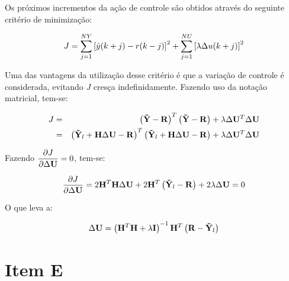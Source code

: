 Os próximos incrementos da ação de controle são obtidos através do seguinte
critério de minimização:

\begin{equation*}
J = \sum_{j=1}^{NY}\left[\hat{y}(k+j)-r(k-j)\right]^2 + 
    \sum_{j=1}^{NU}\left[\lambda\Delta u(k+j)\right]^2
\end{equation*}

Uma das vantagens da utilização desse critério é que a variação de controle é
considerada, evitando $J$ cresça indefinidamente. Fazendo uso da notação
matricial, tem-se:

\begin{eqnarray}
J & = & \left(\mathbf{\tilde{Y}}-\mathbf{R}\right)^T\left(\mathbf{\tilde{Y}}-\mathbf{R}\right) + 
        \lambda\Delta\mathbf{U}^T\Delta\mathbf{U}\nonumber\\
& = & \left(\mathbf{\tilde{Y}}_l+\mathbf{H}\Delta\mathbf{U}-\mathbf{R}\right)^T
      \left(\mathbf{\tilde{Y}}_l+\mathbf{H}\Delta\mathbf{U}-\mathbf{R}\right) + 
      \lambda\Delta\mathbf{U}^T\Delta\mathbf{U}\nonumber
\end{eqnarray}

Fazendo $\displaystyle\frac{\partial J}{\partial\Delta\mathbf{U}} = 0$, tem-se:

\begin{equation*}
\frac{\partial J}{\partial\Delta\mathbf{U}} = 
2\mathbf{H}^T\mathbf{H}\Delta\mathbf{U} + 
2\mathbf{H}^T\left(\mathbf{\tilde{Y}}_l-\mathbf{R}\right) +
2\lambda\Delta\mathbf{U} = 0
\end{equation*}

O que leva a:

\begin{equation}\label{eq:delta_u}
\Delta\mathbf{U} = \left(\mathbf{H}^T\mathbf{H}+\lambda\mathbf{I}\right)^{-1}\mathbf{H}^T
               \left(\mathbf{R}-\mathbf{\tilde{Y}}_l\right)
\end{equation}

\section*{Item E}
